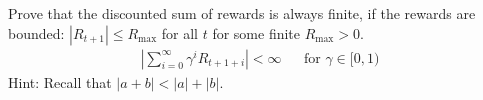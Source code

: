 Prove that the discounted sum of rewards is always finite, if the rewards are bounded: $|R_{t+1} | \le R_\text{max}$ for all $t$ for some finite $R_\text{max} > 0$. 
%
\begin{align*}
\left| \sum_{i=0}^\infty \gamma^i R_{t+1+i} \right| < \infty && \text{for } \gamma \in [0,1)
\end{align*}
%
Hint: Recall that $|a + b| < |a| + |b|$. 
\smallspace
